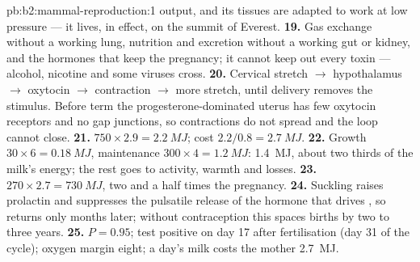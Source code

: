 \begin{solution}{pb:b2:mammal-reproduction:1}
output, and its tissues are adapted to work at low pressure --- it
lives, in effect, on the summit of Everest.
\textbf{19.} Gas exchange without a working lung, nutrition and
excretion without a working gut or kidney, and the hormones that
keep the pregnancy; it cannot keep out every toxin --- alcohol,
nicotine and some viruses cross.
\textbf{20.} Cervical stretch $\to$ hypothalamus $\to$ oxytocin $\to$
contraction $\to$ more stretch, until delivery removes the stimulus.
Before term the progesterone-dominated uterus has few oxytocin
receptors and no gap junctions, so contractions do not spread and the
loop cannot close.
\textbf{21.} $750\times 2.9 = \qty{2.2}{MJ}$; cost $2.2/0.8 =
\qty{2.7}{MJ}$.
\textbf{22.} Growth $30\times 6 = \qty{0.18}{MJ}$, maintenance
$300\times 4 = \qty{1.2}{MJ}$: \qty{1.4}{MJ}, about two thirds of the
milk's energy; the rest goes to activity, warmth and losses.
\textbf{23.} $270\times 2.7 = \qty{730}{MJ}$, two and a half times the
pregnancy.
\textbf{24.} Suckling raises prolactin and suppresses the pulsatile
release of the hormone that drives , so  returns
only months later; without contraception this spaces births by two
to three years.
\textbf{25.} $P = 0.95$; test positive on day 17 after fertilisation
(day 31 of the cycle); oxygen margin eight; a day's milk costs the
mother \qty{2.7}{MJ}.
\end{solution}
